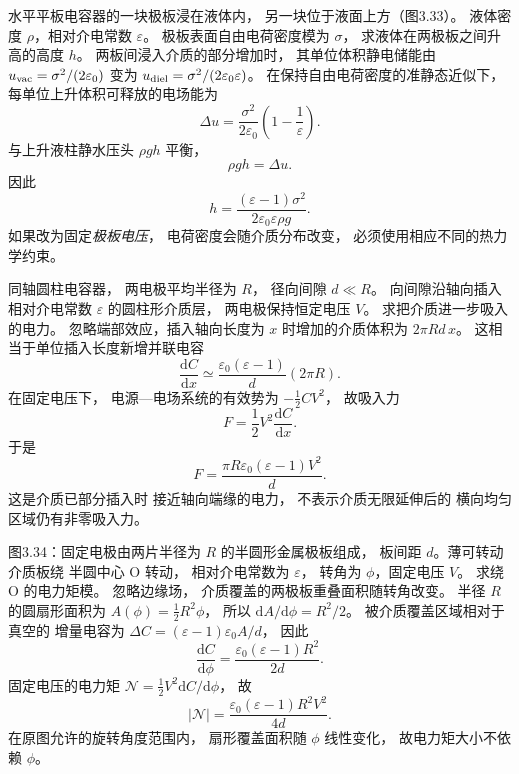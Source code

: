水平平板电容器的一块极板浸在液体内，
另一块位于液面上方（图3.33）。
液体密度 $\rho$，相对介电常数
$\varepsilon$。
极板表面自由电荷密度模为 $\sigma$，
求液体在两极板之间升高的高度 $h$。
\exsolution
两板间浸入介质的部分增加时，
其单位体积静电储能由
$u_{\rm vac}=\sigma^2/(2\varepsilon_0)$
变为
$u_{\rm diel}=\sigma^2/(2\varepsilon_0\varepsilon)$。
在保持自由电荷密度的准静态近似下，
每单位上升体积可释放的电场能为
\[
\Delta u=\frac{\sigma^2}{2\varepsilon_0}
\left(1-\frac1\varepsilon\right).
\]
与上升液柱静水压头 $\rho gh$ 平衡，
\[
\rho gh=\Delta u.
\]
因此
\[
\boxed{h=\frac{(\varepsilon-1)\sigma^2}
{2\varepsilon_0\varepsilon\rho g}}.
\]
\excheck 如果改为固定\emph{极板电压}，
电荷密度会随介质分布改变，
必须使用相应不同的热力学约束。

同轴圆柱电容器，
两电极平均半径为 $R$，
径向间隙 $d\ll R$。
向间隙沿轴向插入相对介电常数
$\varepsilon$ 的圆柱形介质层，
两电极保持恒定电压 $V$。
求把介质进一步吸入的电力。
\exsolution
忽略端部效应，插入轴向长度为 $x$
时增加的介质体积为
$2\pi Rd\,x$。
这相当于单位插入长度新增并联电容
\[
\frac{\mathrm dC}{\mathrm dx}
\simeq\frac{\varepsilon_0(\varepsilon-1)}d
(2\pi R).
\]
在固定电压下，
电源—电场系统的有效势为
$-\frac12CV^2$，
故吸入力
\[
F=\frac12V^2\frac{\mathrm dC}{\mathrm dx}.
\]
于是
\[
\boxed{F=\frac{\pi R\varepsilon_0
(\varepsilon-1)V^2}{d}}.
\]
\excheck 这是介质已部分插入时
接近轴向端缘的电力，
不表示介质无限延伸后的
横向均匀区域仍有非零吸入力。

图3.34：固定电极由两片半径为 $R$
的半圆形金属极板组成，
板间距 $d$。薄可转动介质板绕
半圆中心 O 转动，
相对介电常数为 $\varepsilon$，
转角为 $\phi$，固定电压 $V$。
求绕 O 的电力矩模。
\exsolution
忽略边缘场，
介质覆盖的两极板重叠面积随转角改变。
半径 $R$ 的圆扇形面积为
$A(\phi)=\frac12R^2\phi$，
所以
$\mathrm dA/\mathrm d\phi=R^2/2$。
被介质覆盖区域相对于真空的
增量电容为
$\Delta C=(\varepsilon-1)\varepsilon_0A/d$，
因此
\[
\frac{\mathrm dC}{\mathrm d\phi}
=\frac{\varepsilon_0(\varepsilon-1)R^2}{2d}.
\]
固定电压的电力矩
$\mathcal N=\frac12V^2\mathrm dC/\mathrm d\phi$，
故
\[
\boxed{|\mathcal N|=
\frac{\varepsilon_0(\varepsilon-1)R^2V^2}{4d}}.
\]
\excheck 在原图允许的旋转角度范围内，
扇形覆盖面积随 $\phi$ 线性变化，
故电力矩大小不依赖 $\phi$。
